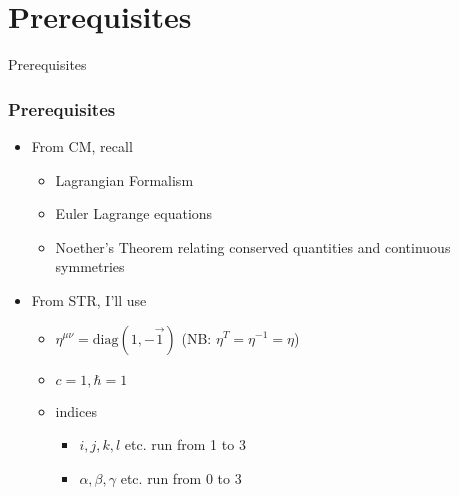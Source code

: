 \documentclass{beamer}
\begin{document}
\section{Prerequisites}
\begin{frame}	
	\Huge{\centerline{Prerequisites}}
\end{frame}

\begin{frame}
	\frametitle{Prerequisites}
		\begin{itemize}
			\item From CM, recall
			\begin{itemize}
				\item Lagrangian Formalism
				\pause
				\item Euler Lagrange equations
				\pause
				\item Noether's Theorem relating conserved quantities and continuous symmetries
				\pause
			\end{itemize}
			\item From STR, I'll use
			\begin{itemize}
				\item $\eta^{\mu\nu}=\text{diag}(1,-\vec{1})$ (NB: $\eta^{T}=\eta^{-1}=\eta$)
				\pause
				\item $c=1, \hbar=1$
				\pause
				\item indices
				\begin{itemize}
					\item $i,j,k,l$ etc. run from 1 to 3
					\pause
					\item $\alpha,\beta,\gamma$ etc. run from 0 to 3
					\pause
				\end{itemize}
			\end{itemize}

		\end{itemize}
\end{frame}
\end{document}
